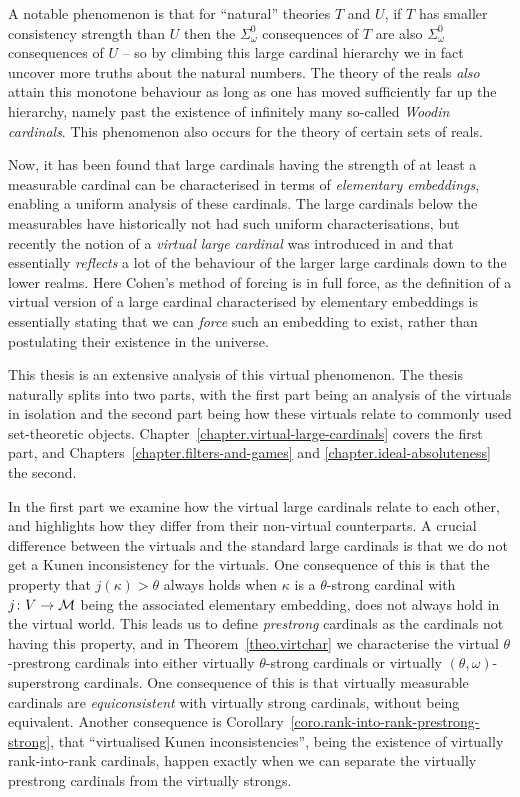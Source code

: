 \documentclass[../main]{subfiles}
\begin{document}
\begin{onehalfspacing}
\quad A notable phenomenon is that for ``natural'' theories $T$ and $U$, if $T$ has smaller consistency strength than $U$ then the $\Sigma^0_\omega$ consequences of $T$ are also $\Sigma^0_\omega$ consequences of $U$ -- so by climbing this large cardinal hierarchy we in fact uncover more truths about the natural numbers. The theory of the reals \textit{also} attain this monotone behaviour as long as one has moved sufficiently far up the hierarchy, namely past the existence of infinitely many so-called \textit{Woodin cardinals}. This phenomenon also occurs for the theory of certain sets of reals.

\quad Now, it has been found that large cardinals having the strength of at least a measurable cardinal can be characterised in terms of \textit{elementary embeddings}, enabling a uniform analysis of these cardinals. The large cardinals below the measurables have historically not had such uniform characterisations, but recently the notion of a \textit{virtual large cardinal} was introduced in \cite{Schindler} and \cite{GitmanSchindler} that essentially \textit{reflects} a lot of the behaviour of the larger large cardinals down to the lower realms. Here Cohen's method of forcing is in full force, as the definition of a virtual version of a large cardinal characterised by elementary embeddings is essentially stating that we can \textit{force} such an embedding to exist, rather than postulating their existence in the universe.

\quad This thesis is an extensive analysis of this virtual phenomenon. The thesis naturally splits into two parts, with the first part being an analysis of the virtuals in isolation and the second part being how these virtuals relate to commonly used set-theoretic objects. Chapter~\ref{chapter.virtual-large-cardinals} covers the first part, and Chapters~\ref{chapter.filters-and-games} and \ref{chapter.ideal-absoluteness} the second. 

\quad In the first part we examine how the virtual large cardinals relate to each other, and highlights how they differ from their non-virtual counterparts. A crucial difference between the virtuals and the standard large cardinals is that we do not get a Kunen inconsistency for the virtuals. One consequence of this is that the property that $j(\kappa)>\theta$ always holds when $\kappa$ is a $\theta$-strong cardinal with $j\colon V\to\operatorname{\mathcal M}$ being the associated elementary embedding, does not always hold in the virtual world. This leads us to define \textit{prestrong} cardinals as the cardinals not having this property, and in Theorem~\ref{theo.virtchar} we characterise the virtual $\theta$-prestrong cardinals into either virtually $\theta$-strong cardinals or virtually $(\theta,\omega)$-superstrong cardinals. One consequence of this is that virtually measurable cardinals are \textit{equiconsistent} with virtually strong cardinals, without being equivalent. Another consequence is Corollary~\ref{coro.rank-into-rank-prestrong-strong}, that ``virtualised Kunen inconsistencies'', being the existence of virtually rank-into-rank cardinals, happen exactly when we can separate the virtually prestrong cardinals from the virtually strongs.


\end{onehalfspacing}
\end{document}
